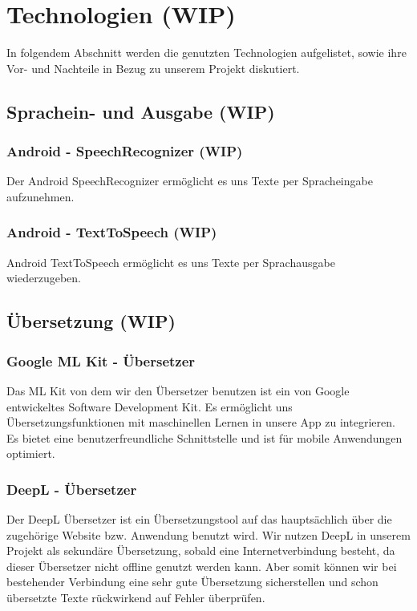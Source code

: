 \newpage
\section{Technologien (WIP)}\label{sec:stateOfTheArt}
In folgendem Abschnitt werden die genutzten Technologien aufgelistet, sowie ihre Vor- und Nachteile in Bezug zu unserem Projekt diskutiert.
\subsection{Sprachein- und Ausgabe (WIP)}

\subsubsection{Android - SpeechRecognizer (WIP)}
Der Android SpeechRecognizer ermöglicht es uns Texte per Spracheingabe aufzunehmen.

\subsubsection{Android - TextToSpeech (WIP)}
Android TextToSpeech ermöglicht es uns Texte per Sprachausgabe wiederzugeben.

\subsection{Übersetzung (WIP)}

\subsubsection{Google ML Kit - Übersetzer}
Das ML Kit von dem wir den Übersetzer benutzen ist ein von Google entwickeltes Software Development Kit. Es ermöglicht uns Übersetzungsfunktionen mit maschinellen Lernen in unsere App zu integrieren. Es bietet eine benutzerfreundliche Schnittstelle und ist für mobile Anwendungen optimiert.

\subsubsection{DeepL - Übersetzer}
Der DeepL Übersetzer ist ein Übersetzungstool auf das hauptsächlich über die zugehörige Website bzw. Anwendung benutzt wird. Wir nutzen DeepL in unserem Projekt als sekundäre Übersetzung, sobald eine Internetverbindung besteht, da dieser Übersetzer nicht offline genutzt werden kann. Aber somit können wir bei bestehender Verbindung eine sehr gute Übersetzung sicherstellen und schon übersetzte Texte rückwirkend auf Fehler überprüfen.